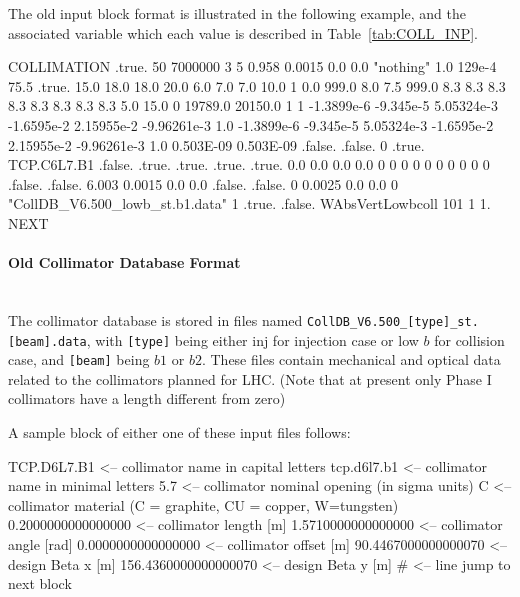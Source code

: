The old input block format is illustrated in the following example, and the associated variable which each value is described in Table~\ref{tab:COLL_INP}.

\bigskip
\begin{cverbatim}
COLLIMATION
   .true.
   50   7000000
   3  5  0.958  0.0015  0.0  0.0  "nothing"  1.0 129e-4  75.5
   .true.  15.0  18.0  18.0  20.0  6.0  7.0  7.0  10.0 1 0.0  999.0  8.0   7.5   999.0
   8.3  8.3  8.3  8.3  8.3  8.3  8.3  8.3  5.0 15.0
   0 19789.0  20150.0  1  1
  -1.3899e-6  -9.345e-5  5.05324e-3  -1.6595e-2  2.15955e-2  -9.96261e-3  1.0
  -1.3899e-6  -9.345e-5  5.05324e-3  -1.6595e-2  2.15955e-2  -9.96261e-3  1.0
   0.503E-09  0.503E-09
  .false. .false. 0 .true. TCP.C6L7.B1 .false. .true. .true. .true. .true.
   0.0 0.0 0.0 0.0
   0   0   0   0   0   0   0   0   0   0   .false.
  .false.  6.003  0.0015
   0.0 0.0 .false. .false.
   0   0.0025  0.0   0.0   0
   "CollDB_V6.500_lowb_st.b1.data"  1
   .true. .false. WAbsVertLowbcoll  101  1  1.
NEXT
\end{cverbatim}

\paragraph{Old Collimator Database Format}~\\

The collimator database is stored in files named \texttt{CollDB\_V6.500\_[type]\_st.[beam].data}, with \texttt{[type]} being either inj for injection case or low $b$ for collision case, and \texttt{[beam]} being $b1$ or $b2$.
These files contain mechanical and optical data related to the collimators planned for LHC. (Note that at present only Phase I collimators have a length different from zero)

A sample block of either one of these input files follows:

\begin{cverbatim}
TCP.D6L7.B1             <-- collimator name in capital letters
tcp.d6l7.b1             <-- collimator name in minimal letters
5.7                     <-- collimator nominal opening (in sigma units)
C                       <-- collimator material (C = graphite, CU = copper, W=tungsten)
  0.2000000000000000    <-- collimator length [m]
  1.5710000000000000    <-- collimator angle [rad]
  0.0000000000000000    <-- collimator offset [m]
 90.4467000000000070    <-- design Beta x [m]
156.4360000000000070    <-- design Beta y [m]
#                       <-- line jump to next block
\end{cverbatim}

